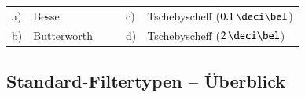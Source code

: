 \begin{tabular}{ll cc ll}
    a) & Bessel         & & & c) & Tschebyscheff ($0.1 \, \deci \bel$) \\
    b) & Butterworth    & & & d) & Tschebyscheff ($2 \, \deci \bel$) \\
\end{tabular}



\subsection{Standard-Filtertypen -- Überblick}
\label{Standard-Filtertypen}

